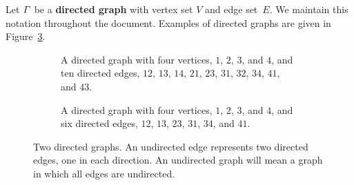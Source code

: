 \documentclass[11pt]{article}
\theoremstyle{definition}
\numberwithin{equation}{section}
\newcommand{\vocab}[1]{\textbf{#1}}
\newcommand{\vertices}{V}
\newcommand{\edges}{E}
\begin{document}
Let \(\varGamma\) be a \vocab{directed graph} with vertex set \(\vertices\) and edge set~\(\edges\).
We maintain this notation throughout the document.
Examples of directed graphs are given in Figure~\ref{fig:directedgraphs}.

\begin{figure}[htbp]
    \centering
    \begin{subfigure}[b]{0.47\textwidth}
        \centering
        \caption{A directed graph with four vertices, \(1\), \(2\), \(3\), and \(4\), and ten directed edges, \(12\), \(13\), \(14\), \(21\), \(23\), \(31\), \(32\), \(34\), \(41\), and \(43\).}
        \label{fig:directedgraphs:1}
    \end{subfigure}
    \hfill
    \begin{subfigure}[b]{0.47\textwidth}
        \centering
        \caption{A directed graph with four vertices, \(1\), \(2\), \(3\), and \(4\), and six directed edges, \(12\), \(13\), \(23\), \(31\), \(34\), and \(41\).}
        \label{fig:directedgraphs:2}
    \end{subfigure}
    \caption{Two directed graphs.  An undirected edge represents two directed edges, one in each direction. An undirected graph will mean a graph in which all edges are undirected.}
    \label{fig:directedgraphs}
\end{figure}
\end{document}
